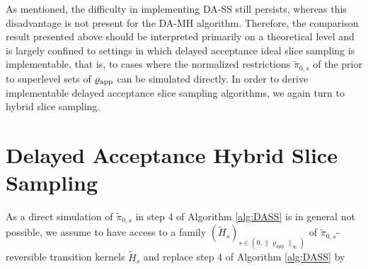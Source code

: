 \documentclass[sn-mathphys-num]{sn-jnl}%
\theoremstyle{thmstyleone}%
\theoremstyle{thmstyletwo}%
\theoremstyle{thmstylethree}%
\newcommand{\rhoapp}{\varrho_{{\rm app}}}
\newcommand{\change}[1]{\bgroup\color{black}#1\egroup}    %
\begin{document}

\change{As mentioned}, the difficulty in implementing DA-SS still persists, whereas this disadvantage is not present for the DA-MH algorithm. 
Therefore, the comparison result presented above should be interpreted primarily on a theoretical level and is largely confined to settings in which delayed acceptance ideal slice sampling is implementable, that is, to cases where the normalized restrictions $\widetilde{\pi}_{0,s}$ of the prior to superlevel sets of $\rhoapp$ can be simulated directly. 
In order to derive implementable delayed acceptance slice sampling algorithms, we again turn to hybrid slice sampling. 


\section{Delayed Acceptance Hybrid Slice Sampling}\label{sec:DAHSS}
As %
a direct simulation of 
$\widetilde{\pi}_{0,s}$ %
 in step 4 of Algorithm \ref{alg:DASS} is in general not possible, we assume to have access to
a family $(\widetilde H_s)_{s \in (0, \|\varrho_\text{app}\|_\infty)}$ of $\widetilde{\pi}_{0,s}$-reversible transition kernels $\widetilde H_s$ and replace step 4 of Algorithm \ref{alg:DASS} by  

\vspace*{0.2cm}
\end{document}
